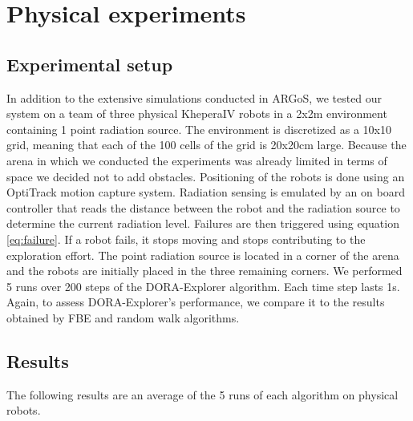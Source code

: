 \section{Physical experiments}
\subsection{Experimental setup}
In addition to the extensive simulations conducted in ARGoS, we tested
our system on a team of three physical KheperaIV robots in a 2x2m
environment containing 1 point radiation source. The environment is discretized as a 10x10 grid, meaning that each of
the 100 cells of the grid is 20x20cm large. Because the arena in
which we conducted the experiments was already limited in terms of
space we decided not to add obstacles.
Positioning of the
robots is done using an OptiTrack motion capture system. Radiation sensing is emulated
by an on board controller that reads the distance between the robot
and the radiation source to determine the current radiation
level. Failures are then triggered using equation \eqref{eq:failure}. If a robot fails, it stops moving and stops contributing to the exploration effort. The point
radiation source is located in a corner of the arena and the robots
are initially placed in the three remaining corners. We performed 5 runs over
200 steps of the DORA-Explorer algorithm. Each time step lasts 1s. Again, to assess DORA-Explorer's performance, we compare it to the results obtained by FBE and random
walk algorithms.



\subsection{Results}
The following results are an average of the 5 runs of each algorithm on physical robots.

